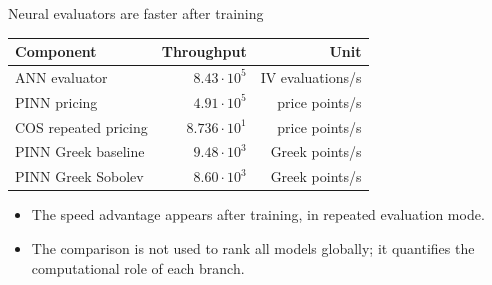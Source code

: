 \begin{frame}{Neural evaluators are faster after training}
  \centering
  \begin{tabular}{lrr}
    \toprule
    Component & Throughput & Unit \\
    \midrule
    ANN evaluator & \(8.43\cdot10^{5}\) & IV evaluations/s \\
    PINN pricing & \(4.91\cdot10^{5}\) & price points/s \\
    COS repeated pricing & \(8.736\cdot10^{1}\) & price points/s \\
    PINN Greek baseline & \(9.48\cdot10^{3}\) & Greek points/s \\
    PINN Greek Sobolev & \(8.60\cdot10^{3}\) & Greek points/s \\
    \bottomrule
  \end{tabular}

  \vspace{7mm}
  \begin{itemize}
    \item The speed advantage appears after training, in repeated evaluation mode.
    \item The comparison is not used to rank all models globally; it quantifies the computational role of each branch.
  \end{itemize}
\end{frame}
